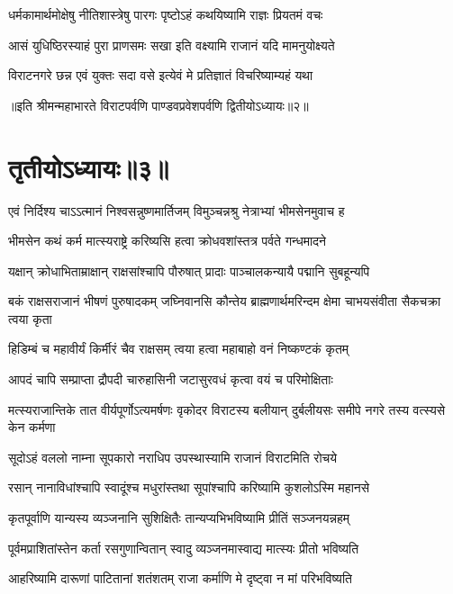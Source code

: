 \twolineshloka
{धर्मकामार्थमोक्षेषु नीतिशास्त्रेषु पारगः}
{पृष्टोऽहं कथयिष्यामि राज्ञः प्रियतमं वचः}


\twolineshloka
{आसं युधिष्ठिरस्याहं पुरा प्राणसमः सखा}
{इति वक्ष्यामि राजानं यदि मामनुयोक्ष्यते}


\twolineshloka
{विराटनगरे छन्न एवं युक्तः सदा वसे}
{इत्येवं मे प्रतिज्ञातं विचरिष्याम्यहं यथा}

॥इति श्रीमन्महाभारते विराटपर्वणि पाण्डवप्रवेशपर्वणि द्वितीयोऽध्यायः॥२॥

\chapter{तृतीयोऽध्यायः॥३॥}

\twolineshloka
{एवं निर्दिश्य चाऽऽत्मानं निश्वसन्नुष्णमार्तिजम्}
{विमुञ्चन्नश्रु नेत्राभ्यां भीमसेनमुवाच ह}


\twolineshloka
{भीमसेन कथं कर्म मात्स्यराष्ट्रे करिष्यसि}
{हत्वा क्रोधवशांस्तत्र पर्वते गन्धमादने}


\twolineshloka
{यक्षान् क्रोधाभिताम्राक्षान् राक्षसांश्चापि पौरुषात्}
{प्रादाः पाञ्चालकन्यायै पद्मानि सुबहून्यपि}


\threelineshloka
{बकं राक्षसराजानं भीषणं पुरुषादकम्}
{जघ्निवानसि कौन्तेय ब्राह्मणार्थमरिन्दम}
{क्षेमा चाभयसंवीता सैकचक्रा त्वया कृता}


\twolineshloka
{हिडिम्बं च महावीर्यं किर्मीरं चैव राक्षसम्}
{त्वया हत्वा महाबाहो वनं निष्कण्टकं कृतम्}


\twolineshloka
{आपदं चापि सम्प्राप्ता द्रौपदी चारुहासिनी}
{जटासुरवधं कृत्वा वयं च परिमोक्षिताः}


\threelineshloka
{मत्स्यराजान्तिके तात वीर्यपूर्णोऽत्यमर्षणः}
{वृकोदर विराटस्य बलीयान् दुर्बलीयसः}
{समीपे नगरे तस्य वत्स्यसे केन कर्मणा}




\twolineshloka
{सूदोऽहं वललो नाम्ना सूपकारो नराधिप}
{उपस्थास्यामि राजानं विराटमिति रोचये}


\twolineshloka
{रसान् नानाविधांश्चापि स्वादूंश्च मधुरांस्तथा}
{सूपांश्चापि करिष्यामि कुशलोऽस्मि महानसे}


\twolineshloka
{कृतपूर्वाणि यान्यस्य व्यञ्जनानि सुशिक्षितैः}
{तान्यप्यभिभविष्यामि प्रीतिं सञ्जनयन्नहम्}


\twolineshloka
{पूर्वमप्राशितांस्तेन कर्ता रसगुणान्वितान्}
{स्वादु व्यञ्जनमास्वाद्य मात्स्यः प्रीतो भविष्यति}


\twolineshloka
{आहरिष्यामि दारूणां पाटितानां शतंशतम्}
{राजा कर्माणि मे दृष्ट्वा न मां परिभविष्यति}


